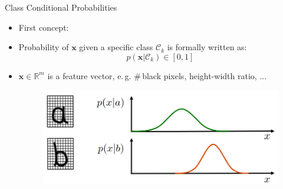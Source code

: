 \begin{frame}{Class Conditional Probabilities}{}
	\begin{itemize}
		\item First concept: 
		\item Probability of $\bm{x}$ given a specific class $\mathcal{C}_k$ is formally written as:
		\begin{equation}
			p(\bm{x} \vert \mathcal{C}_k) \in [0, 1]
		\end{equation}
		\item $\bm{x} \in \mathbb{R}^m$ is a feature vector, e.\,g. \#\,black pixels, height-width ratio, ...
		\begin{figure}
			\centering
			\includegraphics[scale=0.3]{03_decision_theory/02_img/conditional_probabilities}
		\end{figure}
	\end{itemize}
\end{frame}


